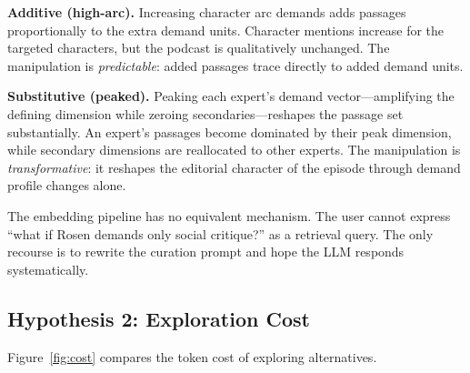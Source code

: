 \documentclass[final]{clv2025}
\begin{document}
\textbf{Additive (high-arc).}  Increasing character arc demands adds
passages proportionally to the extra demand units.  Character mentions
increase for the targeted characters, but the podcast is qualitatively
unchanged.  The manipulation is \emph{predictable}: added passages
trace directly to added demand units.

\textbf{Substitutive (peaked).}  Peaking each expert's demand
vector---amplifying the defining dimension while zeroing
secondaries---reshapes the passage set substantially.  An expert's
passages become dominated by their peak dimension, while secondary
dimensions are reallocated to other experts.  The manipulation is
\emph{transformative}: it reshapes the editorial character of the
episode through demand profile changes alone.

The embedding pipeline has no equivalent mechanism.  The user cannot
express ``what if Rosen demands only social critique?'' as a retrieval
query.  The only recourse is to rewrite the curation prompt and hope
the LLM responds systematically.


\subsection{Hypothesis 2: Exploration Cost}
\label{sec:cost}

Figure~\ref{fig:cost} compares the token cost of exploring alternatives.
\end{document}
